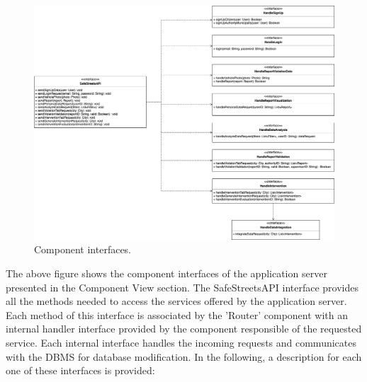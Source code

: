 \begin{figure}[H]
	\centering
	\includegraphics[width=\linewidth]{Images/ComponentInterfaces}
	\caption{Component interfaces.}
\end{figure}
The above figure shows the component interfaces of the application server presented in the Component View section. The SafeStreetsAPI interface provides all the methods needed to access the services offered by the application server. Each method of this interface is associated by the 'Router' component with an internal handler interface provided by the component responsible of the requested service. Each internal interface handles the incoming requests and communicates with the DBMS for database modification. In the following, a description for each one of these interfaces is provided:
